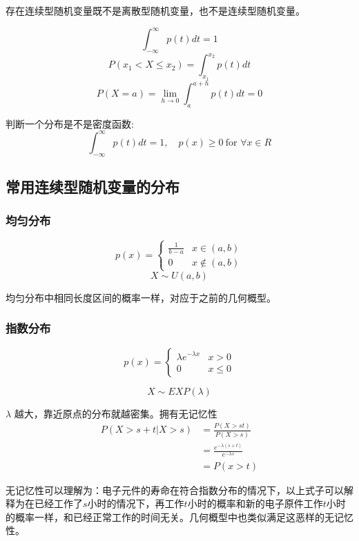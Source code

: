 \documentclass[10pt, a4paper]{article}
\begin{document}
        存在连续型随机变量既不是离散型随机变量，也不是连续型随机变量。

        $$\int_{-\infty}^{\infty}p(t)dt = 1$$
        $$P(x_1 < X \leqslant x_2) = \int_{x_1}^{x_2}p(t)dt$$
        $$P(X = a) = \lim_{h\rightarrow0}\int_{a}^{a + h}p(t)dt = 0$$

        判断一个分布是不是密度函数:
        $$\int_{-\infty}^{\infty}p(t)dt = 1, \quad p(x) \geqslant 0 \ \text{for } \forall x \in R $$
    \subsection{常用连续型随机变量的分布}
        \subsubsection{均匀分布}
        $$
        p(x) = 
        \begin{cases}
            \frac{1}{b - a} & x \in (a, b) \\
            0 & x\notin (a, b)
        \end{cases}
        $$
        $$X \sim U(a, b)$$

        均匀分布中相同长度区间的概率一样，对应于之前的几何概型。  
        
        \subsubsection{指数分布}
        $$
        p(x) = 
        \begin{cases}
            \lambda e^{-\lambda x} & x > 0 \\
            0 & x \leqslant 0 
        \end{cases}
        $$

        $$X \sim EXP(\lambda)$$
    
        $\lambda$ 越大，靠近原点的分布就越密集。拥有无记忆性
        $$\begin{aligned} 
            P(X > s + t | X > s)
            &= \frac{P(X > s  t)}{P(X > s)} \\
            &= \frac{e^{-\lambda(s + t)}}{e ^ {-\lambda s}}\\
            &= P(x > t) 
        \end{aligned}
        $$
        
        无记忆性可以理解为：电子元件的寿命在符合指数分布的情况下，以上式子可以解释为在已经工作了$s$小时的情况下，再工作$t$小时的概率和新的电子原件工作$t$小时的概率一样，和已经正常工作的时间无关。几何概型中也类似满足这恶样的无记忆性。
        
\end{document}
